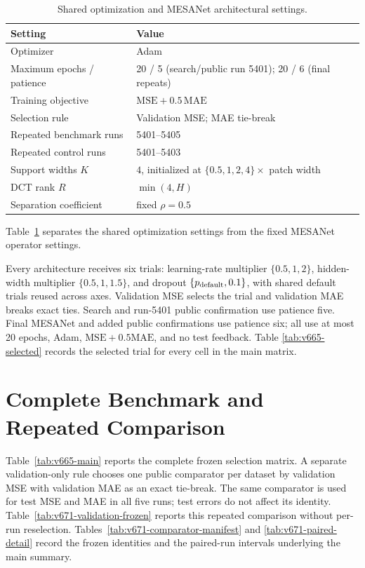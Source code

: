 \documentclass[letterpaper,10pt]{article}
\begin{document}
\begin{table}[H]
\centering
\setlength{\tabcolsep}{6pt}
\caption{Shared optimization and MESANet architectural settings.}
\label{tab:v665-config}
\begin{tabular}{@{}ll@{}}
\toprule
Setting & Value \\
\midrule
Optimizer & Adam \\
Maximum epochs / patience & 20 / 5 (search/public run 5401); 20 / 6 (final repeats) \\
Training objective & $\mathrm{MSE}+0.5\,\mathrm{MAE}$ \\
Selection rule & Validation MSE; MAE tie-break \\
Repeated benchmark runs & 5401--5405 \\
Repeated control runs & 5401--5403 \\
Support widths $K$ & $4$, initialized at $\{0.5,1,2,4\}\times$ patch width \\
DCT rank $R$ & $\min(4,H)$ \\
Separation coefficient & fixed $\rho=0.5$ \\
\bottomrule
\end{tabular}
\end{table}

Table~\ref{tab:v665-config} separates the shared optimization settings from
the fixed MESANet operator settings.

Every architecture receives six trials: learning-rate multiplier
$\{0.5,1,2\}$, hidden-width multiplier $\{0.5,1,1.5\}$, and dropout
$\{p_{\rm default},0.1\}$, with shared default trials reused across axes.
Validation MSE selects the trial and validation MAE breaks exact ties. Search
and run-5401 public confirmation use patience five. Final MESANet and added
public confirmations use patience six; all use at most 20 epochs, Adam,
$\mathrm{MSE}+0.5\mathrm{MAE}$, and no test feedback. Table
\ref{tab:v665-selected} records the selected trial for every cell in the main
matrix.



\section{Complete Benchmark and Repeated Comparison}

Table~\ref{tab:v665-main} reports the complete frozen selection matrix. A
separate validation-only rule chooses one public comparator per dataset by
validation MSE with validation MAE as an exact tie-break. The same comparator
is used for test MSE and MAE in all five runs; test errors do not affect its
identity. Table~\ref{tab:v671-validation-frozen} reports this repeated
comparison without per-run reselection.
Tables~\ref{tab:v671-comparator-manifest} and
\ref{tab:v671-paired-detail} record the frozen identities and the paired-run
intervals underlying the main summary.
\end{document}
